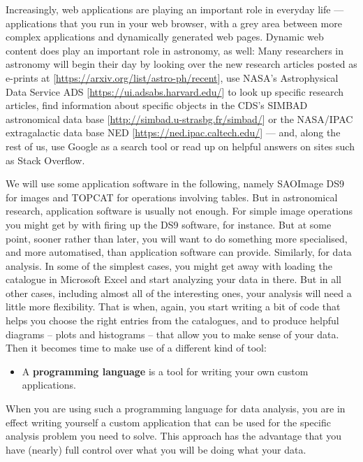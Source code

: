 \documentclass[twocolumn,apj]{openjournal}
\begin{document}
Increasingly, web applications are playing an important role in everyday life --- applications that you run in your web browser, with a grey area between more complex applications and dynamically generated web pages. Dynamic web content does play an important role in astronomy, as well: Many researchers in astronomy will begin their day by looking over the new research articles posted as e-prints at [\href{https://arxiv.org/list/astro-ph/recent}{https://arxiv.org/list/astro-ph/recent}], use NASA's Astrophysical Data Service ADS [\href{https://ui.adsabs.harvard.edu/}{https://ui.adsabs.harvard.edu/}] to look up specific research articles, find information about specific objects in the CDS's SIMBAD astronomical data base [\href{http://simbad.u-strasbg.fr/simbad/}{http://simbad.u-strasbg.fr/simbad/}] or the NASA/IPAC extragalactic data base NED [\href{https://ned.ipac.caltech.edu/}{https://ned.ipac.caltech.edu/}] --- and, along the rest of us, use Google as a search tool or read up on helpful answers on sites such as Stack Overflow.

We will use some application software in the following, namely SAOImage DS9 for images and TOPCAT for operations involving tables. But in astronomical research, application software is usually not enough. For simple image operations you might get by with firing up the DS9 software, for instance. But at some point, sooner rather than later, you will want to do something more specialised, and more automatised, than application software can provide. Similarly, for data analysis. 
In some of the simplest cases, you might get away with loading the catalogue in Microsoft Excel and start analyzing your data in there. But in all other cases, including almost all of the interesting ones, your analysis will need a little more flexibility. That is when, again, you start writing a bit of code that helps you choose the right entries from the catalogues, and to produce helpful diagrams -- plots and histograms -- that allow you to make sense of your data. Then it becomes time to make use of a different kind of tool:
\begin{itemize}
\item A {\bf programming language} is a tool for writing your own custom applications. 
\end{itemize}
When you are using such a programming language for data analysis, you are in effect writing yourself a custom application that can be used for the specific analysis problem you need to solve. This approach has the advantage that you have (nearly) full control over what you will be doing what your data. 
\end{document}
